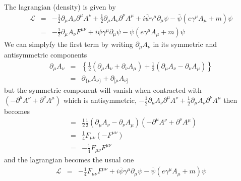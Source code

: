 \documentclass[aps,preprint,preprintnumbers,nofootinbib,showpacs,prd]{revtex4-1}
\newcommand{\nbea}{\begin{eqnarray*}}
\newcommand{\neea}{\end{eqnarray*}}
\begin{document}
The lagrangian (density) is given by
%
\nbea
\mathcal{L} & = & -\frac{1}{2} \partial_\mu A_\nu \partial^\mu A^\nu + \frac{1}{2} \partial_\mu A_\nu \partial^\nu A^\mu + i \overline \psi \gamma^\mu \partial_\mu \psi - \overline \psi \left ( e \gamma^\mu A_\mu + m\right ) \psi \\
& = & -\frac{1}{2} \partial_\mu A_\nu F^{\mu\nu} + i \overline \psi \gamma^\mu \partial_\mu \psi - \overline \psi \left ( e \gamma^\mu A_\mu + m\right ) \psi
\neea
%
We can simplyfy the first term by writing $\partial_\mu A_\nu$ in its symmetric and antisymmetric components
%
\nbea
\partial_\mu A_\nu & = & \left \{ \frac{1}{2} (\partial_\mu A_\nu + \partial_\nu A_\mu) + \frac{1}{2} (\partial_\mu A_\nu - \partial_\nu A_\mu)\right \} \\
& = & \partial_{\{\mu} A_{\nu\}} + \partial_{[\mu} A_{\nu]}
\neea
%
but the symmetric component will vanish when contracted with $(- \partial^\mu A^\nu + \partial^\nu A^\mu)$ which is antisymmetric, $-\frac{1}{2} \partial_\mu A_\nu \partial^\mu A^\nu + \frac{1}{2} \partial_\mu A_\nu \partial^\nu A^\mu$ then becomes
%
\nbea
& = & \frac{1}{2} \frac{1}{2} (\partial_\mu A_\nu - \partial_\nu A_\mu) (- \partial^\mu A^\nu + \partial^\nu A^\mu) \\
& = & \frac{1}{4} F_{\mu\nu} (-F^{\mu\nu}) \\
& = & -\frac{1}{4} F_{\mu\nu} F^{\mu\nu} 
\neea
%
and the lagrangian becomes the usual one
%
\nbea
\mathcal{L} & = & -\frac{1}{4} F_{\mu\nu} F^{\mu\nu}  + i \overline \psi \gamma^\mu \partial_\mu \psi - \overline \psi \left ( e \gamma^\mu A_\mu + m\right ) \psi
\neea
%
\end{document}
